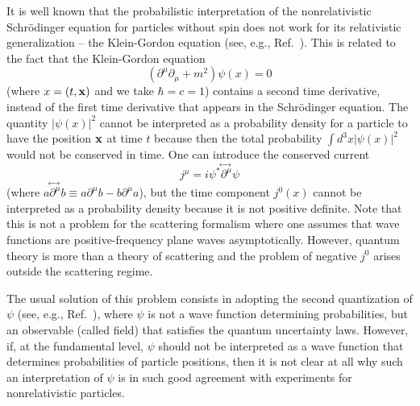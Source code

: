\documentclass[11pt]{article}
\begin{document}
It is well known that the probabilistic interpretation 
of the nonrelativistic Schr\"odinger equation for 
particles without spin does not work for its relativistic 
generalization -- the Klein-Gordon equation
(see, e.g., Ref.~\cite{bjor1}).
This is related to the fact that the Klein-Gordon equation
\begin{equation}\label{KG}
(\partial^{\mu}\partial_{\mu}+m^2)\psi(x)=0
\end{equation}
(where $x=(t,\bf{x})$ and we take $\hbar=c=1$) 
contains a second time derivative, instead of the first time 
derivative that appears in the Schr\"odinger equation.
%
%
The quantity $|\psi(x)|^2$ cannot be interpreted as a 
probability density for a particle to have the position $\bf{x}$ 
at time $t$ because then the total probability 
$\int d^3x |\psi(x)|^2$ would not be conserved in time.
One can introduce the conserved current
\begin{equation}\label{cur}
j^{\mu}=i\psi^* \!\stackrel{\leftrightarrow\;}{\partial^{\mu}}\! \psi 
\end{equation}
(where $a \!\stackrel{\leftrightarrow\;}{\partial^{\mu}}\! b \equiv
a\partial^{\mu}b - b\partial^{\mu}a$),
but the time component $j^0(x)$ cannot be interpreted as a probability 
density because it is not positive definite.
%
Note that this is not a problem for the scattering formalism 
where one assumes that wave functions are positive-frequency 
plane waves asymptotically. However, quantum theory is more 
than a theory of scattering and the problem of negative 
$j^0$ arises outside the scattering regime.  

The usual solution of this problem consists in adopting the 
second quantization of $\psi$ (see, e.g., Ref.~\cite{bjor2}), where 
$\psi$ is not a wave function determining probabilities, but  
an observable (called field) that satisfies the quantum 
uncertainty laws. However, if, at the fundamental level,
$\psi$ should not be interpreted as a wave function 
that determines probabilities of particle positions, then 
it is not clear at all why
such an interpretation of $\psi$ is in such good 
agreement with experiments for nonrelativistic particles.
\end{document}
